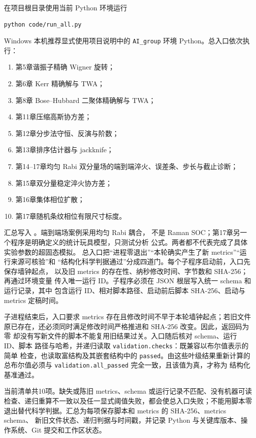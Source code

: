 在项目根目录使用当前 Python 环境运行
\begin{lstlisting}[style=bookpython]
python code/run_all.py
\end{lstlisting}
Windows 本机推荐显式使用项目说明中的 \texttt{AI\_group} 环境 Python。总入口依次执行：
\begin{enumerate}
  \item 第5章谐振子精确 Wigner 旋转；
  \item 第6章 Kerr 精确解与 TWA；
  \item 第8章 Bose--Hubbard 二聚体精确解与 TWA；
  \item 第11章压缩高斯协方差；
  \item 第12章分步法守恒、反演与阶数；
  \item 第13章排序估计器与 jackknife；
  \item 第14--17章均匀 Rabi 双分量场的端到端淬火、误差条、步长与截止诊断；
  \item 第15章双分量稳定淬火协方差；
  \item 第16章集体相位扩散；
  \item 第17章随机条纹相位有限尺寸标度。
\end{enumerate}
汇总写入 。端到端场案例采用均匀 Rabi 耦合，
不是 Raman SOC；第17章另一个程序是明确定义的统计玩具模型，只测试分析
公式。两者都不代表完成了具体实验参数的超固态模拟。
总入口把“进程零退出”“本轮确实产生了新 metrics”“运行来源可核验”和
“结构化科学判据通过”分成四道门。每个子程序启动前，入口先保存墙钟起点，
以及旧 metrics 的存在性、纳秒修改时间、字节数和 SHA-256；再通过环境变量
传入唯一运行 ID。子程序必须在 JSON 根层写入统一 schema 和运行记录，其中
包含运行 ID、相对脚本路径、启动前后脚本 SHA-256、启动与 metrics 定稿时间。

子进程结束后，入口要求 metrics 存在且修改时间不早于本轮墙钟起点；若旧文件
原已存在，还必须同时满足修改时间严格推进和 SHA-256 改变。因此，返回码为零
却没有写新文件的脚本不能复用旧结果过关。入口随后核对 schema、运行 ID、脚本
路径与哈希，并递归读取 \texttt{validation.checks}：既兼容以布尔值表示的简单
检查，也读取富结构及其嵌套结构中的 \texttt{passed}。由这些叶级结果重新计算的
总布尔值必须与 \texttt{validation.all\_passed} 完全一致，且该值为真，才称为
结构化基准通过。

当前清单共10项。缺失或陈旧 metrics、schema 或运行记录不匹配、没有机器可读
检查、递归重算不一致以及任一显式阈值失败，都会使总入口失败；不能用脚本零
退出替代科学判据。汇总为每项保存脚本和 metrics 的 SHA-256、metrics schema、
新旧文件状态、递归判据与时间戳，并记录 Python 与关键库版本、操作系统、Git
提交和工作区状态。

